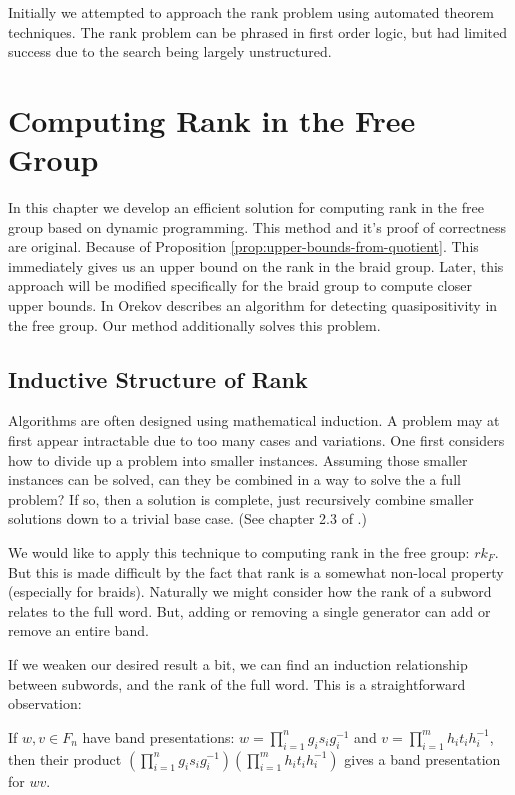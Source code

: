 \documentclass[12pt]{thesis}
\begin{document}
Initially we attempted to approach the rank problem
using automated theorem techniques. The rank problem can be phrased
in first order logic, but had limited success due to the search
being largely unstructured.

\fi

\chapter{Computing Rank in the Free Group}

\label{chap:free-rank}

In this chapter we develop an efficient solution for computing rank 
in the free group based on dynamic programming.
This method and it's proof of correctness are original. 
Because of Proposition \ref{prop:upper-bounds-from-quotient}.
This immediately gives us an upper bound on the rank in the braid group.
Later, this approach will be modified specifically for the braid group to compute closer
upper bounds.
In \cite{quasipositive-3-braids} Orekov describes
an algorithm for detecting quasipositivity in the free group.
Our method additionally solves this problem.

\section{Inductive Structure of Rank}

Algorithms are often designed using mathematical induction.  
A problem may at first appear intractable due to too many cases and variations.
One first considers how to divide up a problem into smaller instances.
Assuming those smaller instances can be solved, can they be combined in a way to solve the a full problem?
If so, then a solution is complete, just recursively combine smaller solutions
down to a trivial base case. (See chapter 2.3 of \cite{clrs}.)

We would like to apply this technique to computing rank in the free group: $rk_{F}$.
But this is made difficult by the fact that rank is a somewhat non-local property (especially for braids).
Naturally we might consider how  the rank of a subword relates to the full word.
But, adding or removing a single generator can add
or remove an entire band. 

If we weaken our desired result a bit, we can find an induction relationship between 
subwords, and the rank of the full word.
This is a straightforward observation:

\begin{proposition}
    If $w, v \in F_{n}$ have band presentations:
    $w = \prod_{i=1}^{n} g_{i} s_{i} g_{i}^{-1}$
    and $v = \prod_{i=1}^{m} h_{i} t_{i} h_{i}^{-1}$,
    then their product $(\prod_{i=1}^{n} g_{i} s_{i} g_{i}^{-1}) (\prod_{i=1}^{m} h_{i} t_{i} h_{i}^{-1})$
    gives a band presentation for $wv$.
\end{proposition}
\end{document}
